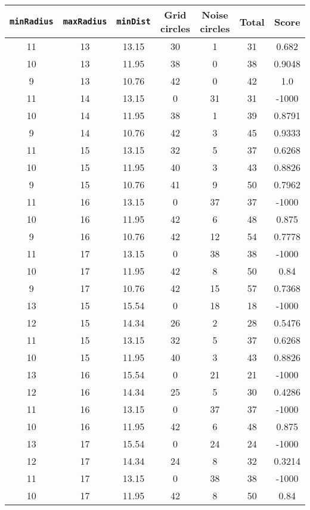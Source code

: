 \documentclass[letterpaper, 12pt]{article}
\begin{document}
\begin{longtable}{|c|c|c|c|c|c|c|}
\hline
\textbf{\texttt{minRadius}} & \textbf{\texttt{maxRadius}} & \textbf{\texttt{minDist}} & \textbf{Grid circles} & \textbf{Noise circles} & \textbf{Total} & \textbf{Score} \\
\hline
11 & 13 & 13.15 & 30 & 1 & 31 & 0.682 \\
\hline
10 & 13 & 11.95 & 38 & 0 & 38 & 0.9048 \\
\hline
9 & 13 & 10.76 & 42 & 0 & 42 & 1.0 \\
\hline
11 & 14 & 13.15 & 0 & 31 & 31 & -1000 \\
\hline
10 & 14 & 11.95 & 38 & 1 & 39 & 0.8791 \\
\hline
9 & 14 & 10.76 & 42 & 3 & 45 & 0.9333 \\
\hline
11 & 15 & 13.15 & 32 & 5 & 37 & 0.6268 \\
\hline
10 & 15 & 11.95 & 40 & 3 & 43 & 0.8826 \\
\hline
9 & 15 & 10.76 & 41 & 9 & 50 & 0.7962 \\
\hline
11 & 16 & 13.15 & 0 & 37 & 37 & -1000 \\
\hline
10 & 16 & 11.95 & 42 & 6 & 48 & 0.875 \\
\hline
9 & 16 & 10.76 & 42 & 12 & 54 & 0.7778 \\
\hline
11 & 17 & 13.15 & 0 & 38 & 38 & -1000 \\
\hline
10 & 17 & 11.95 & 42 & 8 & 50 & 0.84 \\
\hline
9 & 17 & 10.76 & 42 & 15 & 57 & 0.7368 \\
\hline
13 & 15 & 15.54 & 0 & 18 & 18 & -1000 \\
\hline
12 & 15 & 14.34 & 26 & 2 & 28 & 0.5476 \\
\hline
11 & 15 & 13.15 & 32 & 5 & 37 & 0.6268 \\
\hline
10 & 15 & 11.95 & 40 & 3 & 43 & 0.8826 \\
\hline
13 & 16 & 15.54 & 0 & 21 & 21 & -1000 \\
\hline
12 & 16 & 14.34 & 25 & 5 & 30 & 0.4286 \\
\hline
11 & 16 & 13.15 & 0 & 37 & 37 & -1000 \\
\hline
10 & 16 & 11.95 & 42 & 6 & 48 & 0.875 \\
\hline
13 & 17 & 15.54 & 0 & 24 & 24 & -1000 \\
\hline
12 & 17 & 14.34 & 24 & 8 & 32 & 0.3214 \\
\hline
11 & 17 & 13.15 & 0 & 38 & 38 & -1000 \\
\hline
10 & 17 & 11.95 & 42 & 8 & 50 & 0.84 \\

\end{longtable}
\end{document}
